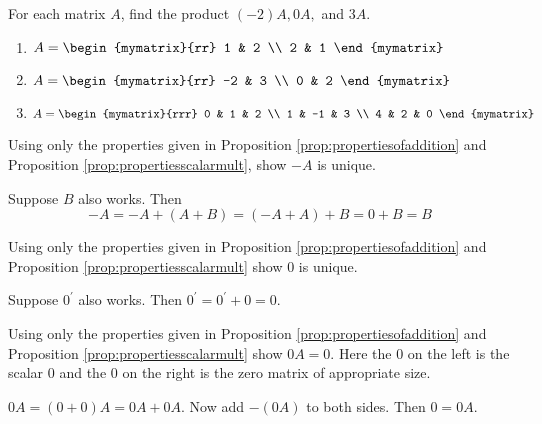 \begin{enumialphparenastyle}

\begin{ex} For each matrix $A$, find the product $(-2)A, 0A,$ and $3A$. 
\begin{enumerate}
\item
$A = \begin{mymatrix}{rr}
1 & 2 \\
2 & 1 
\end{mymatrix}$

\item
$A = \begin{mymatrix}{rr}
-2 & 3 \\
0 & 2 
\end{mymatrix}$

\item
$A = \begin{mymatrix}{rrr}
0 & 1 & 2 \\
1 & -1 & 3 \\
4 & 2 & 0 
\end{mymatrix}$
\end{enumerate}
\end{ex}

\begin{ex} \label{addinvrstunique} Using only the properties given in Proposition \ref{prop:propertiesofaddition}
 and Proposition \ref{prop:propertiesscalarmult}, 
show $-A$ is unique.
\begin{sol}
 Suppose $B$ also works. Then
\[
-A=-A+\left( A+B\right) =\left( -A+A\right) +B=0+B=B
\]
\end{sol}
\end{ex}

\begin{ex} Using only the properties given in Proposition \ref{prop:propertiesofaddition} 
and Proposition \ref{prop:propertiesscalarmult}
show $0$ is unique. 
\begin{sol}
Suppose $0^{\prime }$ also works. Then $0^{\prime }=0^{\prime }+0=0.$
\end{sol}
\end{ex}

\begin{ex} Using only the properties given in Proposition \ref{prop:propertiesofaddition}
 and Proposition \ref{prop:propertiesscalarmult} show $0A=0.$ Here
the $0$ on the left is the scalar $0$ and the $0$ on the right is the zero matrix of appropriate size.
\begin{sol}
$0A=\left( 0+0\right) A=0A+0A.$ Now add $-\left(
0A\right) $ to both sides. Then $0=0A$.
\end{sol}
\end{ex}


\end{enumialphparenastyle}
